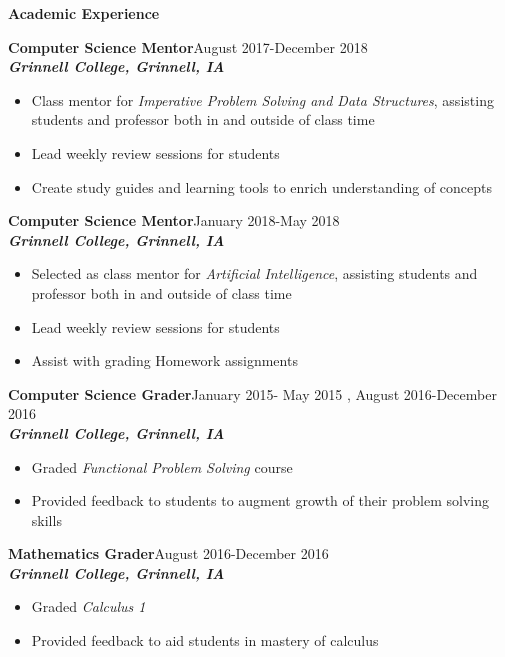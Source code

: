 \documentclass[9pt]{extarticle}
\begin{document}
\begin{large}
\begin{center}\textbf{Academic Experience}
\end{center}
\end{large}
\textbf{Computer Science Mentor}\hfill August 2017-December 2018\\
\textbf{\textit{Grinnell College, Grinnell, IA}}
\begin{itemize}
  \item Class mentor for \textit{Imperative Problem Solving and Data
      Structures}, assisting students and professor both in and
    outside of class time
\item Lead weekly review sessions for students
\item Create study guides and learning tools to enrich understanding
  of concepts
\end{itemize}

\textbf{Computer Science Mentor}\hfill January 2018-May 2018\\
\textbf{\textit{Grinnell College, Grinnell, IA}}
\begin{itemize}
  \item Selected as class mentor for \textit{Artificial Intelligence}, assisting students and professor both in and
    outside of class time
\item Lead weekly review sessions for students
\item Assist with grading Homework assignments
\end{itemize}

\textbf{Computer Science Grader}\hfill January 2015- May 2015 , August
2016-December 2016\\
\textbf{\textit{Grinnell College, Grinnell, IA}}
\begin{itemize}
\item Graded \textit{Functional Problem Solving} course
\item Provided feedback to students to augment growth of their problem solving skills
\end{itemize}


\textbf{Mathematics Grader}\hfill August 2016-December 2016\\
\textbf{\textit{Grinnell College, Grinnell, IA}}
\begin{itemize}
\item Graded \textit{Calculus 1}
\item Provided feedback to aid students in mastery of calculus
\end{itemize}
\end{document}
